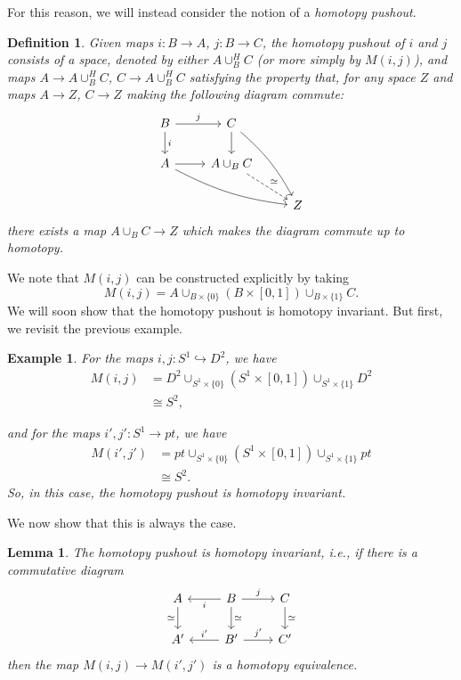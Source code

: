 \documentclass{article}
\newtheorem{lemma}[theorem]{Lemma}
\newtheorem{definition}[theorem]{Definition}
\newtheorem{example}[theorem]{Example}
\newtheorem{proposed work}[theorem]{Proposed Work}
\begin{document}
For this reason, we will instead consider the notion of a \emph{homotopy pushout}.

\begin{definition}
Given maps $i : B \to A$, $j: B \to C$, the \emph{homotopy pushout} of $i$ and $j$ consists of a space, denoted by either $A \cup_B^H C$ (or more simply by $M(i,j)$), and maps $A \to A \cup_B^H C$, $C \to A \cup_B^H C$ satisfying the property that, for any space $Z$ and maps $A \to Z$, $C \to Z$ making the following diagram commute:
\begin{equation*}
\begin{tikzcd}
B \arrow[r, "j"] \arrow[d,"i"] & C \arrow[d] \arrow[ddr, bend left=10] \\
A \arrow[r] \arrow[drr, bend right=10] & A \cup_B C \arrow[dashed, "\simeq", dr] \\
& & Z
\end{tikzcd}
\end{equation*}
there exists a map $A \cup_B C \to Z$ which makes the diagram commute up to homotopy.
\end{definition}

We note that $M(i,j)$ can be constructed explicitly by taking
\begin{equation*}
M(i,j) = A \cup_{B \times \{0\}} (B \times [0,1]) \cup_{B \times \{1\}} C.
\end{equation*}
We will soon show that the homotopy pushout is homotopy invariant. But first, we revisit the previous example. 

\begin{example}
For the maps $i,j: S^1 \hookrightarrow D^2$, we have
\begin{align*}
M(i,j) &= D^2 \cup_{S^1 \times \{0\}} (S^1 \times [0,1]) \cup_{S^1 \times \{1\}} D^2 \\
&\cong S^2,
\end{align*}

and for the maps $i', j': S^1 \to pt$, we have
\begin{align*}
M(i',j') &= pt \cup_{S^1 \times \{0\}} (S^1 \times [0,1]) \cup_{S^1 \times \{1\}} pt \\
&\cong S^2.
\end{align*}
So, in this case, the homotopy pushout is homotopy invariant. 
\end{example}

We now show that this is always the case.

\begin{lemma}\label{hompoinvar}
The homotopy pushout is homotopy invariant, i.e., if there is a commutative diagram
\begin{equation*}
\begin{tikzcd}
A \arrow[d,swap, "\simeq"] & B \arrow[l, "i"] \arrow[r, "j"] \arrow[d, "\simeq"]& C \arrow[d, "\simeq"] \\
A' & B' \arrow[l,swap, "i'"] \arrow[r, "j'"] & C'
\end{tikzcd}
\end{equation*}
then the map $M(i,j) \to M(i',j')$ is a homotopy equivalence. 
\end{lemma}
\end{document}
